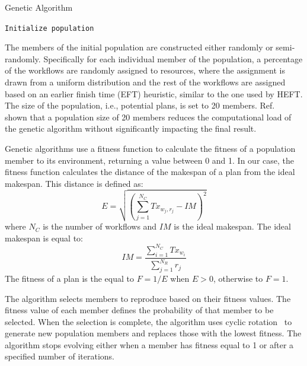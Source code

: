 \begin{algorithm}[t]
    \caption{Genetic Algorithm}
    \label{alg:gen_algo}
    \scriptsize
    \begin{algorithmic}[1]
        \State \texttt{Initialize population}
        \EndWhile
        \EndProcedure
    \end{algorithmic}
\end{algorithm}

The members of the initial population are constructed either randomly or
semi-randomly. Specifically for each individual member of the population,
a percentage of the workflows are randomly assigned
to resources, where the assignment is drawn from a uniform distribution and the
rest of the workflows are assigned based on an earlier finish time (EFT)
heuristic, similar to the one used by HEFT. The size of the population, i.e.,
potential plans, is set to 20 members. Ref.~\cite{zomaya2001observations} shown
that a population size of 20 members reduces the computational load of the
genetic algorithm without significantly impacting the final result.

Genetic algorithms use a fitness function to calculate the fitness of a
population member to its environment, returning a value between 0 and 1. In our
case, the fitness function calculates the distance of the makespan of a plan
from the ideal makespan. This distance is defined as:
\begin{equation}
E = \sqrt{(\sum_{j=1}^{N_{C}}Tx_{w_{j},r_{j}} - IM)^2}
\label{eq:fitness}
\end{equation}
where $N_{C}$ is the number of workflows and $IM$ is the ideal makespan. The
ideal makespan is equal to:
\begin{equation}
IM = \frac{\sum_{i=1}^{N_{C}}Tx_{w_{i}}}{\sum_{j=1}^{N_{R}}r_{j}}
\label{eq:ideal_fitness}
\end{equation}
The fitness of a plan is the equal to $F = 1/E$ when $E > 0$, otherwise to $F =
1$.

The algorithm selects members to reproduce based on their fitness values. The
fitness value of each member defines the probability of that member to be
selected. When the selection is complete, the algorithm uses cyclic
rotation~\cite{oliver1987study} to generate new population members and replaces
those with the lowest fitness.
The algorithm stops evolving either when a member has fitness equal to 1 or
after a specified number of iterations.

